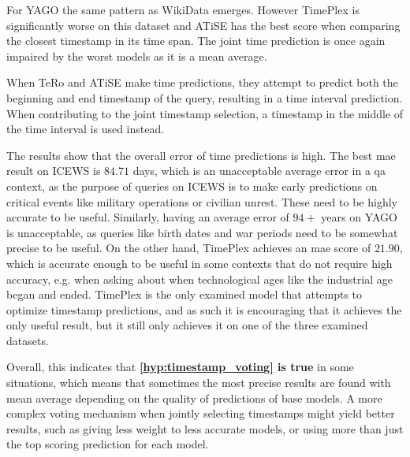 For YAGO the same pattern as WikiData emerges. However TimePlex is significantly worse on this dataset and ATiSE has the best score when comparing the closest timestamp in its time span. The joint time prediction is once again impaired by the worst models as it is a mean average. 

When TeRo and ATiSE make time predictions, they attempt to predict both the beginning and end timestamp of the query, resulting in a time interval prediction. When contributing to the joint timestamp selection, a timestamp in the middle of the time interval is used instead.

The results show that the overall error of time predictions is high. The best \gls{mae} result on \mbox{ICEWS} is $84.71$ days, which is an unacceptable average error in a \gls{qa} context, as the purpose of queries on ICEWS is to make early predictions on critical events like military operations or civilian unrest. These need to be highly accurate to be useful. Similarly, having an average error of $94+$ years on YAGO is unacceptable, as queries like birth dates and war periods need to be somewhat precise to be useful. On the other hand, TimePlex achieves an \gls{mae} score of $21.90$, which is accurate enough to be useful in some contexts that do not require high accuracy, e.g. when asking about when technological ages like the industrial age began and ended. TimePlex is the only examined model that attempts to optimize timestamp predictions, and as such it is encouraging that it achieves the only useful result, but it still only achieves it on one of the three examined datasets.

Overall, this indicates that \textbf{\autoref{hyp:timestamp_voting} is true} in some situations, which means that sometimes the most precise results are found with mean average depending on the quality of predictions of base models. 
A more complex voting mechanism when jointly selecting timestamps might yield better results, such as giving less weight to less accurate models, or using more than just the top scoring prediction for each model.

